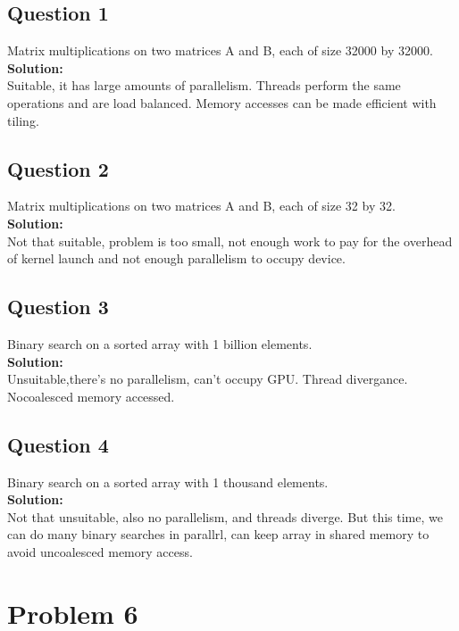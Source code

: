 \documentclass{article}
\begin{document}
\subsection{Question 1}
Matrix multiplications on two matrices A and B, each of size 32000 by 32000.
\\\textbf{Solution: }\\
Suitable, it has large amounts of parallelism. Threads perform the same operations and are load balanced. Memory accesses can be made efficient with tiling.
\subsection{Question 2}
Matrix multiplications on two matrices A and B, each of size 32 by 32.
\\\textbf{Solution: }\\
Not that suitable, problem is too small, not enough work to pay for the overhead of kernel launch and not enough parallelism to occupy device.
\subsection{Question 3}
Binary search on a sorted array with 1 billion elements.
\\\textbf{Solution: }\\
Unsuitable,there's no parallelism, can't occupy GPU. Thread divergance. Nocoalesced memory accessed.
\subsection{Question 4}
Binary search on a sorted array with 1 thousand elements. 
\\\textbf{Solution: }\\
Not that unsuitable, also no parallelism, and threads diverge. But this time, we can do many binary searches in parallrl, can keep array in shared memory to avoid uncoalesced memory access.

\pagebreak

\section{Problem 6}
\end{document}
